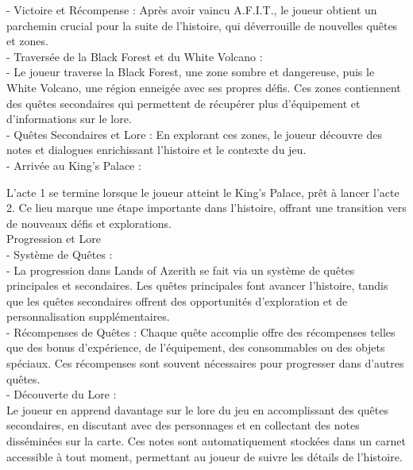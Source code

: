 - Victoire et Récompense : Après avoir vaincu A.F.I.T., le joueur obtient un parchemin crucial pour la suite de l'histoire, qui déverrouille de nouvelles quêtes et zones.
\\

- Traversée de la Black Forest et du White Volcano :
\\

- Le joueur traverse la Black Forest, une zone sombre et dangereuse, puis le White Volcano, une région enneigée avec ses propres défis. Ces zones contiennent des quêtes secondaires qui permettent de récupérer plus d'équipement et d'informations sur le lore.
\\

- Quêtes Secondaires et Lore : En explorant ces zones, le joueur découvre des notes et dialogues enrichissant l'histoire et le contexte du jeu.
\\

- Arrivée au King's Palace :

L'acte 1 se termine lorsque le joueur atteint le King's Palace, prêt à lancer l'acte 2. Ce lieu marque une étape importante dans l'histoire, offrant une transition vers de nouveaux défis et explorations.
\\

Progression et Lore
\\

- Système de Quêtes :
\\

- La progression dans Lands of Azerith se fait via un système de quêtes principales et secondaires. Les quêtes principales font avancer l'histoire, tandis que les quêtes secondaires offrent des opportunités d'exploration et de personnalisation supplémentaires.
\\

- Récompenses de Quêtes : Chaque quête accomplie offre des récompenses telles que des bonus d'expérience, de l'équipement, des consommables ou des objets spéciaux. Ces récompenses sont souvent nécessaires pour progresser dans d'autres quêtes.
\\

- Découverte du Lore :
\\

Le joueur en apprend davantage sur le lore du jeu en accomplissant des quêtes secondaires, en discutant avec des personnages et en collectant des notes disséminées sur la carte. Ces notes sont automatiquement stockées dans un carnet accessible à tout moment, permettant au joueur de suivre les détails de l'histoire.
\\


